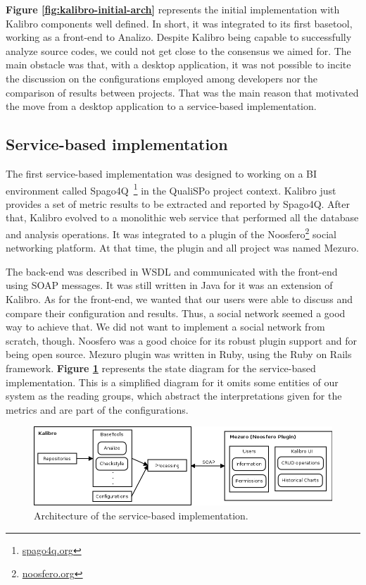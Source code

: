 \textbf{Figure \ref{fig:kalibro-initial-arch}} represents the initial
implementation with Kalibro components well defined. In short, it was
integrated to its first basetool, working as a front-end to Analizo. Despite
Kalibro being capable to successfully analyze source codes, we could not get
close to the consensus we aimed for. The main obstacle was that, with a desktop
application, it was not possible to incite the discussion on the configurations
employed among developers nor the comparison of results between projects. That
was the main reason that motivated the move from a desktop application to a
service-based implementation.

\subsection{Service-based implementation}
\label{subsec:service-based-implementation}

The first service-based implementation was designed to working on a BI
environment called Spago4Q~\footnote{\url{spago4q.org}} in the QualiSPo project
context. Kalibro just provides a set of metric results to be extracted and
reported by Spago4Q.
%
After that, Kalibro evolved to a monolithic web service that performed all the
database and analysis operations. It was integrated to a plugin of the
Noosfero\footnote{\url{noosfero.org}} social networking platform. At that time,
the plugin and all project was named Mezuro.


The back-end was described in WSDL and communicated with the front-end using
SOAP messages.  It was still written in Java for it was an extension of
Kalibro. As for the front-end, we wanted that our users were able to discuss
and compare their configuration and results. Thus, a social network seemed a
good way to achieve that. We did not want to implement a social network from
scratch, though.  Noosfero was a good choice for its robust plugin support and
for being open source. Mezuro plugin was written in Ruby, using the Ruby on
Rails framework. \textbf{Figure \ref{fig:mezuro-noosfero-arch}} represents the
state diagram for the service-based implementation. This is a simplified
diagram for it omits some entities of our system as the reading groups, which
abstract the interpretations given for the metrics and are part of the
configurations.

\begin{figure}[htb]
  \centering
  \includegraphics[width=\textwidth]{images/mezuro-noosfero-arch.png}
  \caption{Architecture of the service-based implementation.}
  \label{fig:mezuro-noosfero-arch}
\end{figure}

